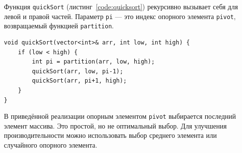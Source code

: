 Функция \texttt{quickSort} (листинг~\ref{code:quicksort}) рекурсивно вызывает себя для левой и правой частей. Параметр \texttt{pi} — это индекс опорного элемента \texttt{pivot}, возвращаемый функцией \texttt{partition}.

\begin{listing}[H]
\caption{Быстрая сортировка (quickSort)}
\label{code:quicksort}
\begin{verbatim}
void quickSort(vector<int>& arr, int low, int high) {
    if (low < high) {
        int pi = partition(arr, low, high);
        quickSort(arr, low, pi-1);
        quickSort(arr, pi+1, high);
    }
}
\end{verbatim}
\end{listing}

В приведённой реализации опорным элементом \texttt{pivot} выбирается последний элемент массива. Это простой, но не оптимальный выбор. Для улучшения производительности можно использовать выбор среднего элемента или случайного опорного элемента.
